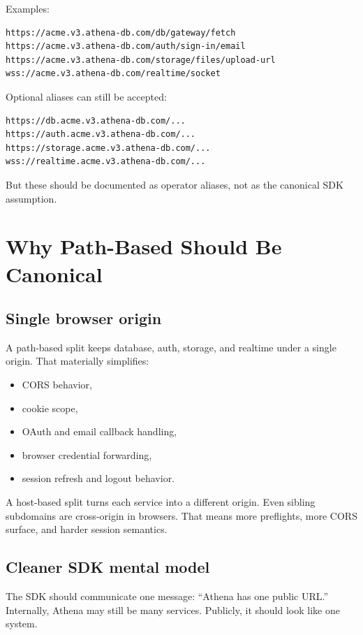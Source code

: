 \documentclass[11pt]{article}
\begin{document}
Examples:

\begin{lstlisting}
https://acme.v3.athena-db.com/db/gateway/fetch
https://acme.v3.athena-db.com/auth/sign-in/email
https://acme.v3.athena-db.com/storage/files/upload-url
wss://acme.v3.athena-db.com/realtime/socket
\end{lstlisting}

Optional aliases can still be accepted:

\begin{lstlisting}
https://db.acme.v3.athena-db.com/...
https://auth.acme.v3.athena-db.com/...
https://storage.acme.v3.athena-db.com/...
wss://realtime.acme.v3.athena-db.com/...
\end{lstlisting}

But these should be documented as operator aliases, not as the canonical SDK assumption.

\section{Why Path-Based Should Be Canonical}

\subsection{Single browser origin}

A path-based split keeps database, auth, storage, and realtime under a single origin. That materially simplifies:

\begin{itemize}[leftmargin=1.5em]
  \item CORS behavior,
  \item cookie scope,
  \item OAuth and email callback handling,
  \item browser credential forwarding,
  \item session refresh and logout behavior.
\end{itemize}

A host-based split turns each service into a different origin. Even sibling subdomains are cross-origin in browsers. That means more preflights, more CORS surface, and harder session semantics.

\subsection{Cleaner SDK mental model}

The SDK should communicate one message: ``Athena has one public URL.'' Internally, Athena may still be many services. Publicly, it should look like one system.
\end{document}
